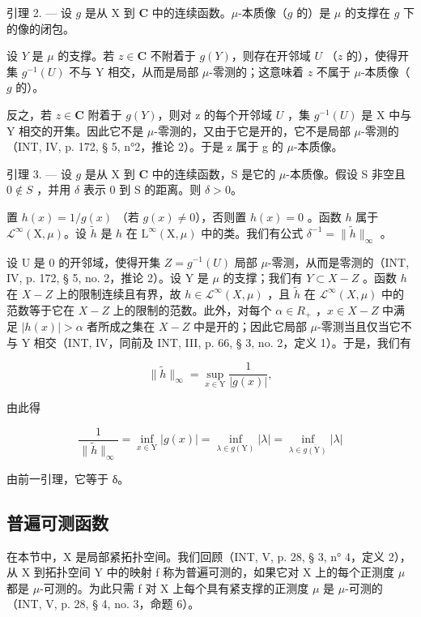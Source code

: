 引理 2. --- 设 \(g\) 是从 X 到 \(\mathbf{C}\) 中的连续函数。\(\mu\)-本质像（\(g\) 的）是 \(\mu\) 的支撑在 \(g\) 下的像的闭包。

设 \(Y\) 是 \(\mu\) 的支撑。若 \(z \in \mathbf{C}\) 不附着于 \(g(Y)\)，则存在开邻域 \(U\) （\(z\) 的），使得开集 \(g^{-1}(U)\) 不与 Y 相交，从而是局部 \(\mu\)-零测的；这意味着 \(z\) 不属于 \(\mu\)-本质像（\(g\) 的）。

反之，若 \(z \in \mathbf{C}\) 附着于 \(g(Y)\)，则对 z 的每个开邻域 \(U\) ，集 \(g^{-1}(U)\) 是 X 中与 Y 相交的开集。因此它不是 \(\mu\)-零测的，又由于它是开的，它不是局部 \(\mu\)-零测的（INT, IV, p. 172, § 5, n°2，推论 2）。于是 z 属于 g 的 \(\mu\)-本质像。

引理 3. --- 设 \(g\) 是从 X 到 \(\mathbf{C}\) 中的连续函数，S 是它的 \(\mu\)-本质像。假设 S 非空且 \(0 \notin S\) ，并用 \(\delta\) 表示 0 到 S 的距离。则 \(\delta > 0\)。

置 \(h(x) = 1 / g(x)\) （若 \(g(x) \neq 0\)），否则置 \(h(x) = 0\) 。函数 \(h\) 属于 \(\mathcal{L}^{\infty}(\mathrm{X},\mu)\)。设 \(\widetilde{h}\) 是 \(h\) 在 \(\mathrm{L}^{\infty}(\mathrm{X},\mu)\) 中的类。我们有公式 \(\delta^{-1} = \| \widetilde{h}\|_{\infty}\) 。

设 U 是 0 的开邻域，使得开集 \(Z = g^{-1}(U)\) 局部 \(\mu\)-零测，从而是零测的（INT, IV, p. 172, § 5, no. 2，推论 2）。设 Y 是 \(\mu\) 的支撑；我们有 \(Y \subset X - Z\) 。函数 \(h\) 在 \(X - Z\) 上的限制连续且有界，故 \(h \in \mathcal{L}^{\infty}(X, \mu)\) ，且 \(\widetilde{h}\) 在 \(\mathcal{L}^{\infty}(X, \mu)\) 中的范数等于它在 \(X - Z\) 上的限制的范数。此外，对每个 \(\alpha \in R_{+}\) ，\(x \in X - Z\) 中满足 \(|h(x)| > \alpha\) 者所成之集在 \(X - Z\) 中是开的；因此它局部 \(\mu\)-零测当且仅当它不与 Y 相交（INT, IV，同前及 INT, III, p. 66, § 3, no. 2，定义 1）。于是，我们有

\[
\| \widetilde {h} \| _ {\infty} = \sup _ {x \in \mathrm{Y}} \frac {1}{| g (x) |},
\]

由此得

\[
\frac {1}{\| \widetilde {h} \| _ {\infty}} = \inf _ {x \in \mathrm{Y}} | g (x) | = \inf _ {\lambda \in g (\mathrm{Y})} | \lambda | = \inf _ {\lambda \in \overline {{g (\mathrm{Y})}}} | \lambda |
\]

由前一引理，它等于 δ。

\subsection{普遍可测函数}

在本节中，X 是局部紧拓扑空间。我们回顾（INT, V, p. 28, § 3, n° 4，定义 2），从 X 到拓扑空间 Y 中的映射 f 称为普遍可测的，如果它对 X 上的每个正测度 \(\mu\) 都是 \(\mu\)-可测的。为此只需 f 对 X 上每个具有紧支撑的正测度 \(\mu\) 是 \(\mu\)-可测的（INT, V, p. 28, § 4, no. 3，命题 6）。

